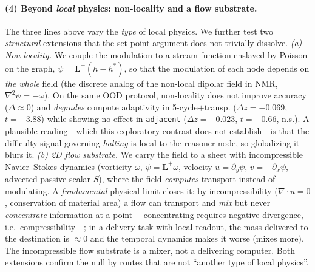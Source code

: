 \documentclass{article}
\begin{document}
\paragraph{(4) Beyond \emph{local} physics: non-locality and a flow substrate.}
The three lines above vary the \emph{type} of local physics. We further test two
\emph{structural} extensions that the set-point argument does not trivially
dissolve. \emph{(a) Non-locality.} We couple the modulation to a stream function
enslaved by Poisson on the graph, $\psi=\mathbf{L}^{+}(h-h^\ast)$, so that the
modulation of each node depends on \emph{the whole} field (the discrete analog of
the non-local dipolar field in NMR, $\nabla^2\psi=-\omega$). On the same OOD
protocol, non-locality does not improve accuracy ($\Delta\approx0$) and
\emph{degrades} compute adaptivity in 5-cycle$+$transp.
($\Delta z={-}0.069$, $t={-}3.88$) while showing no effect in \texttt{adjacent}
($\Delta z={-}0.023$, $t={-}0.66$, n.s.). A plausible reading---which this
exploratory contrast does not establish---is that the difficulty signal
governing \emph{halting} is local to the reasoner node, so globalizing it
blurs it. \emph{(b) 2D flow substrate.} We
carry the field to a sheet with incompressible Navier--Stokes dynamics
(vorticity $\omega$, $\psi=\mathbf{L}^{+}\omega$, velocity
$u=\partial_y\psi,\,v=-\partial_x\psi$, advected passive scalar $S$), where the
field \emph{computes} transport instead of modulating. A \emph{fundamental}
physical limit closes it: by incompressibility ($\nabla\!\cdot u=0$,
conservation of material area) a flow can transport and \emph{mix} but never
\emph{concentrate} information at a point ---concentrating requires negative
divergence, i.e.\ compressibility---; in a delivery task with local readout, the
mass delivered to the destination is $\approx0$ and the temporal dynamics makes
it worse (mixes more). The incompressible flow substrate is a mixer, not a
delivering computer. Both extensions confirm the null by routes that are not
``another type of local physics''.
\end{document}
